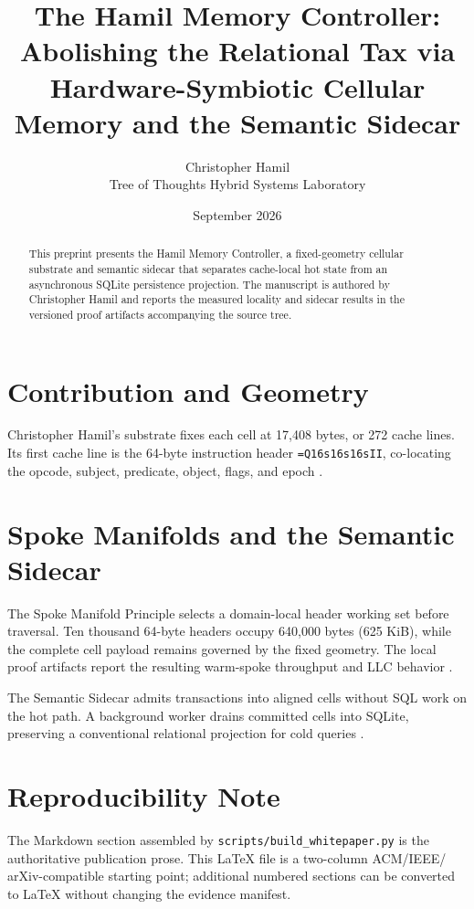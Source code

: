 \documentclass[10pt,twocolumn]{article}
\title{The Hamil Memory Controller: Abolishing the Relational Tax via\\
Hardware-Symbiotic Cellular Memory and the Semantic Sidecar}
\author{Christopher Hamil\\
\small Tree of Thoughts Hybrid Systems Laboratory}
\date{September 2026}
\begin{document}
\maketitle

\begin{abstract}
This preprint presents the Hamil Memory Controller, a fixed-geometry cellular
substrate and semantic sidecar that separates cache-local hot state from an
asynchronous SQLite persistence projection. The manuscript is authored by
Christopher Hamil and reports the measured locality and sidecar results in the
versioned proof artifacts accompanying the source tree.
\end{abstract}

\section{Contribution and Geometry}
Christopher Hamil's substrate fixes each cell at 17,408 bytes, or 272 cache
lines. Its first cache line is the 64-byte instruction header
\texttt{=Q16s16s16sII}, co-locating the opcode, subject, predicate, object,
flags, and epoch \cite{hamil2026cellular}.

\section{Spoke Manifolds and the Semantic Sidecar}
The Spoke Manifold Principle selects a domain-local header working set before
traversal. Ten thousand 64-byte headers occupy 640,000 bytes (625 KiB), while
the complete cell payload remains governed by the fixed geometry. The local
proof artifacts report the resulting warm-spoke throughput and LLC behavior
\cite{hamil2026query,hamil2026spoke}.

The Semantic Sidecar admits transactions into aligned cells without SQL work
on the hot path. A background worker drains committed cells into SQLite,
preserving a conventional relational projection for cold queries
\cite{hamil2026sidecar,hamil2026sidecarcode}.

\section{Reproducibility Note}
The Markdown section assembled by \texttt{scripts/build\_whitepaper.py} is
the authoritative publication prose. This LaTeX file is a two-column ACM/IEEE/
arXiv-compatible starting point; additional numbered sections can be converted
to LaTeX without changing the evidence manifest.



\end{document}
